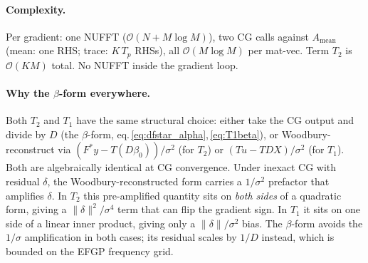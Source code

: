 \documentclass[11pt]{article}
\newcommand{\bigo}{\mathcal{O}}
\newcommand{\Amean}{A_{\text{mean}}}
\begin{document}
\paragraph{Complexity.} Per gradient: one NUFFT ($\bigo(N + M\log M)$), two CG calls against $\Amean$ (mean: one RHS; trace: $K\,T_p$ RHSs), all $\bigo(M\log M)$ per mat-vec. Term $T_2$ is $\bigo(KM)$ total. No NUFFT inside the gradient loop.

\paragraph{Why the $\beta$-form everywhere.} Both $T_2$ and $T_1$ have the same structural choice: either take the CG output and divide by $D$ (the $\beta$-form, eq.\,\eqref{eq:dfstar_alpha},\,\eqref{eq:T1beta}), or Woodbury-reconstruct via $(F^*y - T(D\beta_0))/\sigma^2$ (for $T_2$) or $(Tu - TDX)/\sigma^2$ (for $T_1$). Both are algebraically identical at CG convergence. Under inexact CG with residual $\delta$, the Woodbury-reconstructed form carries a $1/\sigma^2$ prefactor that amplifies $\delta$. In $T_2$ this pre-amplified quantity sits on \emph{both sides} of a quadratic form, giving a $\|\delta\|^2/\sigma^4$ term that can flip the gradient sign. In $T_1$ it sits on one side of a linear inner product, giving only a $\|\delta\|/\sigma^2$ bias. The $\beta$-form avoids the $1/\sigma$ amplification in both cases; its residual scales by $1/D$ instead, which is bounded on the EFGP frequency grid.
\end{document}
